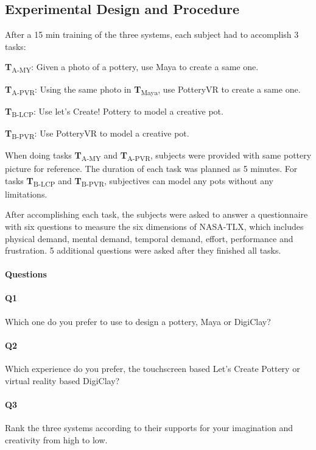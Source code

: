 \subsection{Experimental Design and Procedure}
\label{sec:6.3}

After a 15 min training of the three systems, each subject had to accomplish 3 tasks:

\textbf{T}\textsubscript{A-MY}: Given a photo of a pottery, use Maya to create a same one.

\textbf{T}\textsubscript{A-PVR}: Using the same photo in \textbf{T}\textsubscript{Maya}, use PotteryVR to create a same one.

\textbf{T}\textsubscript{B-LCP}: Use let's Create! Pottery to model a creative pot.

\textbf{T}\textsubscript{B-PVR}: Use PotteryVR to model a creative pot.

When doing tasks \textbf{T}\textsubscript{A-MY} and \textbf{T}\textsubscript{A-PVR}, subjects were provided with same pottery picture for reference. The duration of each task was planned as 5 minutes.
For tasks \textbf{T}\textsubscript{B-LCP} and \textbf{T}\textsubscript{B-PVR}, subjectives can model any pots without any limitations.

After accomplishing each task, the subjects were asked to answer a questionnaire with six questions to measure the six dimensions of NASA-TLX, which includes physical demand, mental demand, temporal demand, effort, performance and frustration. 5 additional questions were asked after they finished all tasks.

\paragraph{Questions}

\paragraph{Q1} Which one do you prefer to use to design a pottery, Maya or DigiClay?
\paragraph{Q2} Which experience do you prefer, the touchscreen based Let's Create Pottery or virtual reality based DigiClay?
\paragraph{Q3} Rank the three systems according to their supports for your imagination and creativity from high to low.
